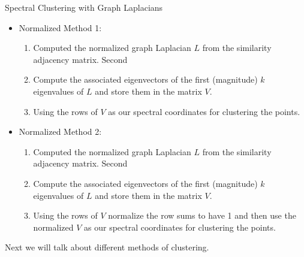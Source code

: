 \documentclass[xcolor=dvipsnames,t]{beamer} %
\begin{document}
\begin{frame}{Spectral Clustering with Graph Laplacians}
\begin{itemize}
\item Normalized Method 1:
\begin{enumerate}
\item Computed the normalized graph Laplacian $L$ from the similarity adjacency matrix. Second 
\item Compute the associated eigenvectors of the first (magnitude) $k$ eigenvalues of $L$ and store them in the matrix $V$. 
\item Using the rows of $V$  as our spectral coordinates for clustering the points. 
\end{enumerate}

\item Normalized Method 2:
\begin{enumerate}
\item Computed the normalized graph Laplacian $L$ from the similarity adjacency matrix. Second 
\item Compute the associated eigenvectors of the first (magnitude) $k$ eigenvalues of $L$ and store them in the matrix $V$. 
\item Using the rows of $V$ normalize the row sums to have 1 and then use the normalized $V$ as our spectral  coordinates for clustering the points. 
\end{enumerate}
\end{itemize}
Next we will talk about different methods of clustering. 
\end{frame}
\end{document}
